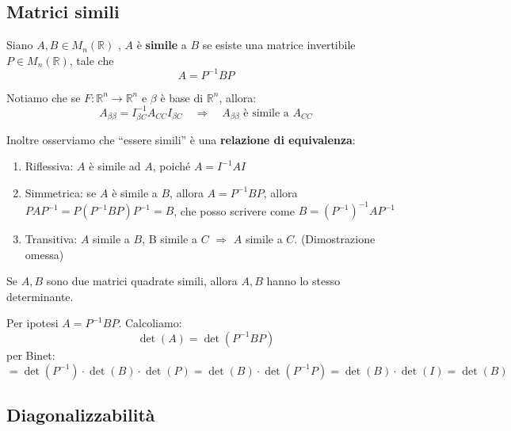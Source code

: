 \documentclass[
  a4paper,
]{article}
\providecommand{\tightlist}{%
  \setlength{\itemsep}{0pt}\setlength{\parskip}{0pt}}
\providecommand{\tightlist}{}
\begin{document}
\hypertarget{matrici-simili}{%
\subsection{Matrici simili}\label{matrici-simili}}

\begin{definitionbox}
Siano \(A, B \in M_n(\mathbb{R})\) , \(A\) è \textbf{simile} a \(B\) se
esiste una matrice invertibile \(P \in M_n(\mathbb{R})\), tale che \[
A = P^{-1}BP
\]
\end{definitionbox}

\begin{observationbox}
Notiamo che se \(F: \mathbb{R}^n \to \mathbb{R}^n\) e \(\beta\) è base
di \(\mathbb{R}^n\), allora: \[
A_{\beta \beta} = I^{-1}_{\beta C}A_{CC}I_{\beta C} \quad \Longrightarrow \quad A_{\beta \beta} \text{ è simile a } A_{C C}
\]
\end{observationbox}

\begin{observationbox}
Inoltre osserviamo che ``essere simili'' è una \textbf{relazione di
equivalenza}:

\begin{enumerate}
\def\labelenumi{\arabic{enumi}.}
\tightlist
\item
  Riflessiva: \(A\) è simile ad \(A\), poiché \(A = I^{-1}AI\)
\item
  Simmetrica: se \(A\) è simile a \(B\), allora \(A = P^{-1}BP\), allora
  \(PAP^{-1} = P(P^{-1}BP)P^{-1} = B\), che posso scrivere come
  \(B = (P^{-1})^{-1}AP^{-1}\)
\item
  Transitiva: \(A\) simile a \(B\), B simile a \(C\) \(\Rightarrow\)
  \(A\) simile a \(C\). (Dimostrazione omessa)
\end{enumerate}
\end{observationbox}

\begin{propositionbox}
Se \(A, B\) sono due matrici quadrate simili, allora \(A, B\) hanno lo
stesso determinante.
\end{propositionbox}

\begin{proofbox}
Per ipotesi \(A = P^{-1}BP\). Calcoliamo: \[
\det(A) = \det(P^{-1}BP)
\] per Binet: \[
= \det(P^{-1})\cdot \det(B) \cdot \det(P) = \det(B) \cdot \det(P^{-1}P) = \det(B) \cdot \det(I) = \det(B)
\]
\end{proofbox}

\hypertarget{diagonalizzabilituxe0}{%
\subsection{Diagonalizzabilità}\label{diagonalizzabilituxe0}}
\end{document}
